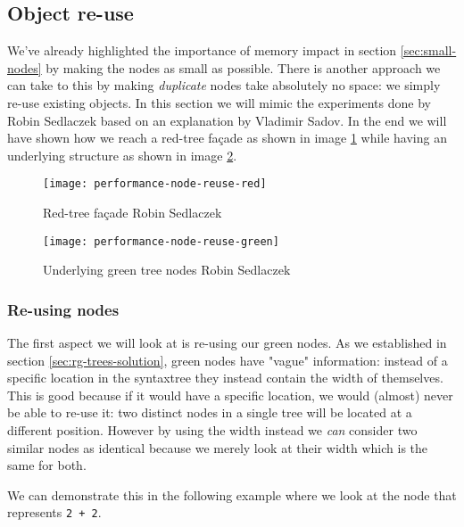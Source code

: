 \newpage
\subsection{Object re-use}
\label{sec:object-reuse}

We've already highlighted the importance of memory impact in section \ref{sec:small-nodes} by making the nodes as small as possible. There is another approach we can take to this by making \textit{duplicate} nodes take absolutely no space: we simply re-use existing objects. In this section we will mimic the experiments done by Robin Sedlaczek\parencite{Sedlaczek2015} based on an explanation by Vladimir Sadov\parencite{Sadov2014}. In the end we will have shown how we reach a red-tree façade as shown in image \ref{img:performance-node-reuse-red} while having an underlying structure as shown in image \ref{img:performance-node-reuse-green}.

\begin{figure}[h]
\centering
\texttt{[image: performance-node-reuse-red]}
\caption[Red-tree façade]{Red-tree façade \textcopyright Robin Sedlaczek}
\label{img:performance-node-reuse-red}
\end{figure}

\begin{figure}[h]
\centering
\texttt{[image: performance-node-reuse-green]}
\caption[Underlying green tree nodes]{Underlying green tree nodes \textcopyright Robin Sedlaczek}
\label{img:performance-node-reuse-green}
\end{figure}

\subsubsection{Re-using nodes}
\label{sec:re-use-nodes}

The first aspect we will look at is re-using our green nodes. As we established in section \ref{sec:rg-trees-solution}, green nodes have "vague" information: instead of a specific location in the \gls{syntaxtree} they instead contain the width of themselves. This is good because if it would have a specific location, we would (almost) never be able to re-use it: two distinct nodes in a single tree will be located at a different position. However by using the width instead we \textit{can} consider two similar nodes as identical because we merely look at their width which is the same for both.

We can demonstrate this in the following example where we look at the node that represents \texttt{2 + 2}.

